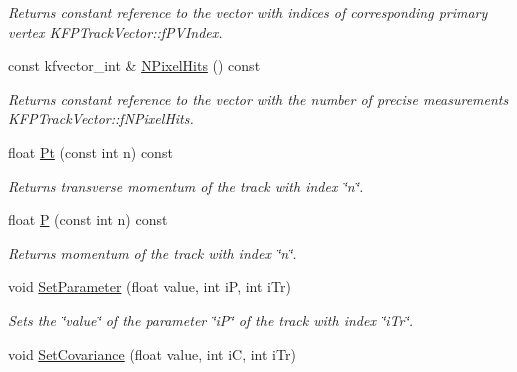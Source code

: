 \begin{DoxyCompactItemize}
\begin{DoxyCompactList}\small\item\em Returns constant reference to the vector with indices of corresponding primary vertex K\+F\+P\+Track\+Vector\+::f\+P\+V\+Index. \end{DoxyCompactList}\item 
const kfvector\+\_\+int \& \hyperlink{classKFPTrackVector_a540c24e9dfbebf828bcdd384ccbf814e}{N\+Pixel\+Hits} () const \hypertarget{classKFPTrackVector_a540c24e9dfbebf828bcdd384ccbf814e}{}\label{classKFPTrackVector_a540c24e9dfbebf828bcdd384ccbf814e}

\begin{DoxyCompactList}\small\item\em Returns constant reference to the vector with the number of precise measurements K\+F\+P\+Track\+Vector\+::f\+N\+Pixel\+Hits. \end{DoxyCompactList}\item 
float \hyperlink{classKFPTrackVector_acbb902f5d4f3818976560addbf5842cc}{Pt} (const int n) const \hypertarget{classKFPTrackVector_acbb902f5d4f3818976560addbf5842cc}{}\label{classKFPTrackVector_acbb902f5d4f3818976560addbf5842cc}

\begin{DoxyCompactList}\small\item\em Returns transverse momentum of the track with index \char`\"{}n\char`\"{}. \end{DoxyCompactList}\item 
float \hyperlink{classKFPTrackVector_acb0d7fca8960e48c91ef072e710ec08c}{P} (const int n) const \hypertarget{classKFPTrackVector_acb0d7fca8960e48c91ef072e710ec08c}{}\label{classKFPTrackVector_acb0d7fca8960e48c91ef072e710ec08c}

\begin{DoxyCompactList}\small\item\em Returns momentum of the track with index \char`\"{}n\char`\"{}. \end{DoxyCompactList}\item 
void \hyperlink{classKFPTrackVector_aaec095be581fb13441c62bddecb88c9f}{Set\+Parameter} (float value, int iP, int i\+Tr)\hypertarget{classKFPTrackVector_aaec095be581fb13441c62bddecb88c9f}{}\label{classKFPTrackVector_aaec095be581fb13441c62bddecb88c9f}

\begin{DoxyCompactList}\small\item\em Sets the \char`\"{}value\char`\"{} of the parameter \char`\"{}i\+P\char`\"{} of the track with index \char`\"{}i\+Tr\char`\"{}. \end{DoxyCompactList}\item 
void \hyperlink{classKFPTrackVector_a3776ecedb9fb1e13e7b51846d3e5276d}{Set\+Covariance} (float value, int iC, int i\+Tr)\hypertarget{classKFPTrackVector_a3776ecedb9fb1e13e7b51846d3e5276d}{}\label{classKFPTrackVector_a3776ecedb9fb1e13e7b51846d3e5276d}


\end{DoxyCompactItemize}
